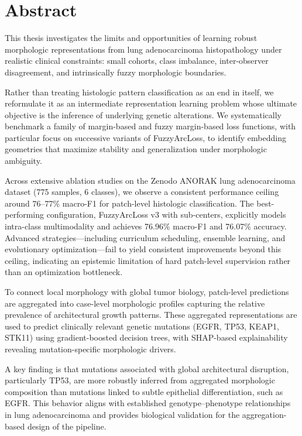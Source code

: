 \chapter{Abstract}

This thesis investigates the limits and opportunities of learning robust morphologic representations from lung adenocarcinoma histopathology under realistic clinical constraints: small cohorts, class imbalance, inter-observer disagreement, and intrinsically fuzzy morphologic boundaries.

Rather than treating histologic pattern classification as an end in itself, we reformulate it as an intermediate representation learning problem whose ultimate objective is the inference of underlying genetic alterations. We systematically benchmark a family of margin-based and fuzzy margin-based loss functions, with particular focus on successive variants of FuzzyArcLoss, to identify embedding geometries that maximize stability and generalization under morphologic ambiguity.

Across extensive ablation studies on the Zenodo ANORAK lung adenocarcinoma dataset (775 samples, 6 classes), we observe a consistent performance ceiling around 76--77\% macro-F1 for patch-level histologic classification. The best-performing configuration, FuzzyArcLoss v3 with sub-centers, explicitly models intra-class multimodality and achieves 76.96\% macro-F1 and 76.07\% accuracy. Advanced strategies---including curriculum scheduling, ensemble learning, and evolutionary optimization---fail to yield consistent improvements beyond this ceiling, indicating an epistemic limitation of hard patch-level supervision rather than an optimization bottleneck.

To connect local morphology with global tumor biology, patch-level predictions are aggregated into case-level morphologic profiles capturing the relative prevalence of architectural growth patterns. These aggregated representations are used to predict clinically relevant genetic mutations (EGFR, TP53, KEAP1, STK11) using gradient-boosted decision trees, with SHAP-based explainability revealing mutation-specific morphologic drivers.

A key finding is that mutations associated with global architectural disruption, particularly TP53, are more robustly inferred from aggregated morphologic composition than mutations linked to subtle epithelial differentiation, such as EGFR. This behavior aligns with established genotype--phenotype relationships in lung adenocarcinoma and provides biological validation for the aggregation-based design of the pipeline.

